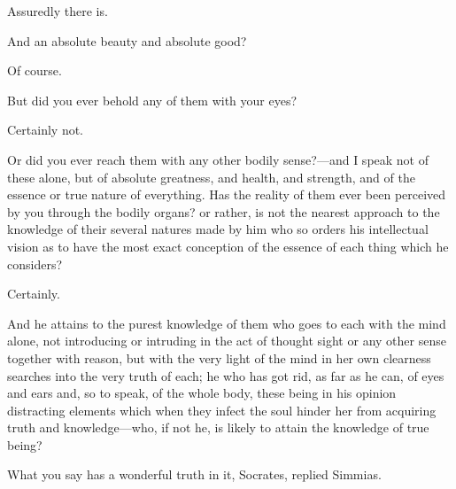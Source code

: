 \documentclass[11pt,letter]{article}
\begin{document}
\par  Assuredly there is.

\par  And an absolute beauty and absolute good?

\par  Of course.

\par  But did you ever behold any of them with your eyes?

\par  Certainly not.

\par  Or did you ever reach them with any other bodily sense?—and I speak not of these alone, but of absolute greatness, and health, and strength, and of the essence or true nature of everything. Has the reality of them ever been perceived by you through the bodily organs? or rather, is not the nearest approach to the knowledge of their several natures made by him who so orders his intellectual vision as to have the most exact conception of the essence of each thing which he considers?

\par  Certainly.

\par  And he attains to the purest knowledge of them who goes to each with the mind alone, not introducing or intruding in the act of thought sight or any other sense together with reason, but with the very light of the mind in her own clearness searches into the very truth of each; he who has got rid, as far as he can, of eyes and ears and, so to speak, of the whole body, these being in his opinion distracting elements which when they infect the soul hinder her from acquiring truth and knowledge—who, if not he, is likely to attain the knowledge of true being?

\par  What you say has a wonderful truth in it, Socrates, replied Simmias.
\end{document}

